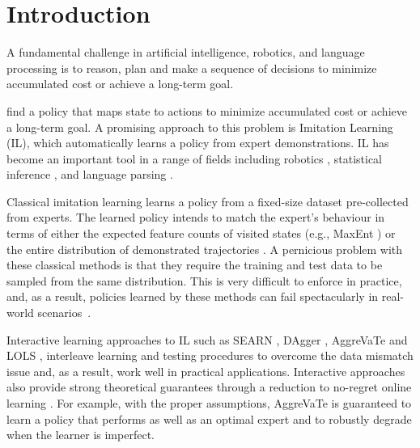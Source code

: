 \section{Introduction}
\label{sec:intro}
  
A fundamental challenge in artificial intelligence, robotics, and language processing is to reason, plan and make a sequence of decisions to minimize accumulated cost or achieve a long-term goal. 

find a policy that maps state to actions to minimize accumulated cost or achieve a long-term goal. A promising approach to this problem is Imitation Learning (IL), which automatically learns a policy from expert demonstrations.  IL has become an important tool in a range of fields including robotics \cite{ross2013learning}, statistical inference \cite{ross2011_CVPR,sun2016learning}, and language parsing \cite{chang2015learning_dependency}. 

Classical imitation learning \cite{abbeel2004apprenticeship,syed2008apprenticeship,ziebart2008maximum,finn2016guided,ho2016generative} learns a policy from a fixed-size dataset pre-collected from experts. The learned policy intends to match the expert's behaviour in terms of either the expected feature counts of visited states (e.g., MaxEnt \cite{ziebart2008maximum}) or the entire distribution of demonstrated trajectories \cite{ho2016generative}. A pernicious problem with these classical methods is that they require the training and test data to be sampled from the same distribution.  This is very difficult to enforce in practice, and, as a result, policies learned by these methods can fail spectacularly in real-world scenarios~\cite{ross2010efficient}.


Interactive learning approaches to IL such as SEARN \cite{daume2009search}, DAgger \cite{Ross2011_AISTATS}, AggreVaTe \cite{ross2014reinforcement} and LOLS \cite{chang2015learning}, interleave learning and testing procedures to overcome the data mismatch issue and, as a result, work well in practical applications. 
Interactive approaches also provide strong theoretical guarantees through a reduction to no-regret online learning \cite{Zinkevich2003_ICML,shalev2012online}. For example, with the proper assumptions, AggreVaTe \cite{ross2014reinforcement} is guaranteed to learn a policy that performs as well as an optimal expert and to robustly degrade when the learner is imperfect.%

